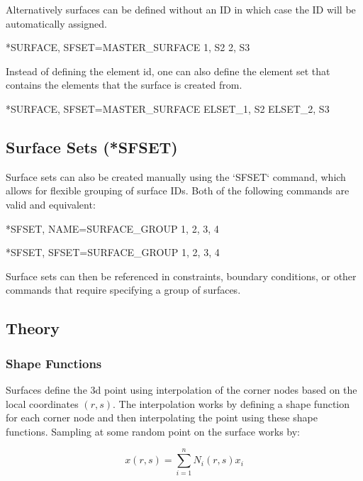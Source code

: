 Alternatively surfaces can be defined without an ID in which case the ID will be automatically assigned.

\begin{codeBlock}
*SURFACE, SFSET=MASTER_SURFACE
1, S2
2, S3
\end{codeBlock}

Instead of defining the element id, one can also define the element set that contains the elements that the surface is created from.

\begin{codeBlock}
*SURFACE, SFSET=MASTER_SURFACE
ELSET_1, S2
ELSET_2, S3
\end{codeBlock}

\subsection{Surface Sets (*SFSET)}

Surface sets can also be created manually using the `SFSET` command, which allows for flexible grouping of surface IDs.
Both of the following commands are valid and equivalent:

\begin{codeBlock}
*SFSET, NAME=SURFACE_GROUP
1, 2, 3, 4
\end{codeBlock}

\begin{codeBlock}
*SFSET, SFSET=SURFACE_GROUP
1, 2, 3, 4
\end{codeBlock}

Surface sets can then be referenced in constraints, boundary conditions, or other commands that require specifying a group of surfaces.

\subsection{Theory}

\subsubsection{Shape Functions}

Surfaces define the 3d point using interpolation of the corner nodes based on the local coordinates $(r, s)$.
The interpolation works by defining a shape function for each corner node and then interpolating the point using these shape functions.
Sampling at some random point on the surface works by:

\[
x(r, s) = \sum_{i=1}^{n} N_i(r, s) x_i
\]

